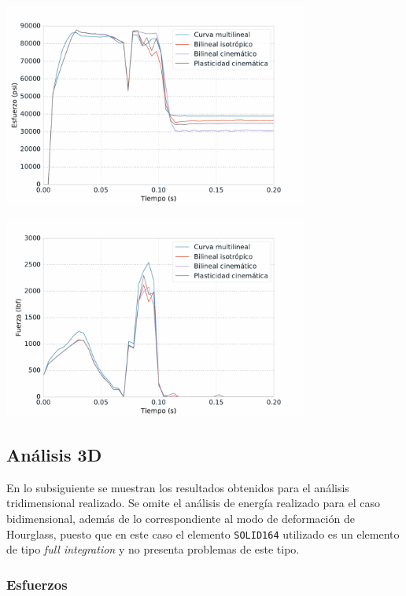 \begin{center}
\includegraphics[width=0.75\textwidth]{src/ch4/mdm_von_mises.pdf}
\label{fig:mdm_von_mises}
\end{center}

\begin{center}
\includegraphics[width=0.75\textwidth]{src/ch4/mdm_force.pdf}
\label{fig:mdm_force}
\end{center}

\subsection{Análisis 3D}

En lo subsiguiente se muestran los resultados obtenidos para el análisis tridimensional 
realizado. Se omite el análisis de energía realizado para el caso bidimensional, además 
de lo correspondiente al modo de deformación de Hourglass, puesto que en este caso el 
elemento \texttt{SOLID164} utilizado es un elemento de tipo \textit{full integration} y 
no presenta problemas de este tipo.

\subsubsection{Esfuerzos}

